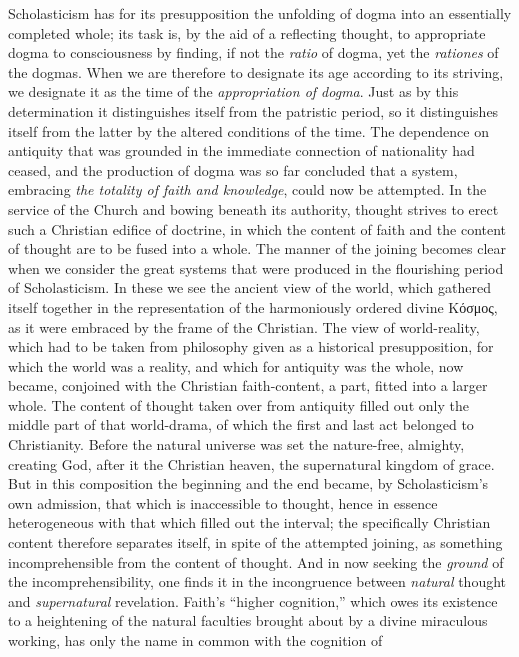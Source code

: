 \documentclass[12pt,a4paper]{book}
\begin{document}
\noindent Scholasticism has for its presupposition the unfolding of dogma
into an essentially completed whole; its task is, by the aid of a reflecting
thought, to appropriate dogma to consciousness by finding, if not the
\textit{ratio} of dogma, yet the \textit{rationes} of the dogmas. When we are
therefore to designate its age according to its striving, we designate it as
the time of the \emph{appropriation of dogma}. Just as by this determination it
distinguishes itself from the patristic period, so it distinguishes itself
from the latter by the altered conditions of the time. The dependence on
antiquity that was grounded in the immediate connection of nationality had
ceased, and the production of dogma was so far concluded that a system,
embracing \emph{the totality of faith and knowledge}, could now be attempted. In the
service of the Church and bowing beneath its authority, thought strives to
erect such a Christian edifice of doctrine, in which the content of faith and
the content of thought are to be fused into a whole. The manner of the
joining becomes clear when we consider the great systems that were produced
in the flourishing period of Scholasticism. In these we see the ancient view
of the world, which gathered itself together in the representation of the
harmoniously ordered divine Κόσμος, as it were embraced by the frame of the
Christian. The view of world-reality, which had to be taken from philosophy
given as a historical presupposition, for which the world was a reality, and
which for antiquity was the whole, now became, conjoined with the Christian
faith-content, a part, fitted into a larger whole. The content of thought
taken over from antiquity filled out only the middle part of that
world-drama, of which the first and last act belonged to Christianity. Before
the natural universe was set the nature-free, almighty, creating God, after
it the Christian heaven, the supernatural kingdom of grace. But in this
composition the beginning and the end became, by Scholasticism's own
admission, that which is inaccessible to thought, hence in essence heterogeneous
with that which filled out the interval; the specifically Christian content
therefore separates itself, in spite of the attempted joining, as something
incomprehensible from the content of thought. And in now seeking the \emph{ground} of the
incomprehensibility, one finds it in the incongruence between \emph{natural} thought
and \emph{supernatural} revelation. Faith's ``higher cognition,'' which owes its
existence to a heightening of the natural faculties brought about by a divine
miraculous working, has only the name in common with the cognition of
\end{document}
